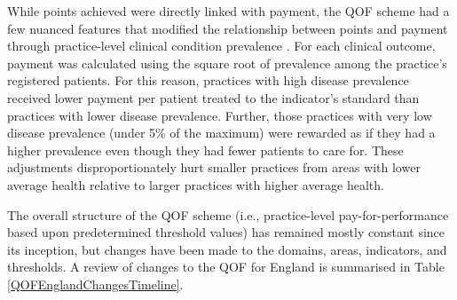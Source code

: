 \documentclass[12pt]{article}
\begin{document}
While points achieved were directly linked with payment, the QOF scheme had a few nuanced features that modified the relationship between points and payment through practice-level clinical condition prevalence \cite{dixonQualityOutcomesFramework2011}. For each clinical outcome, payment was calculated using the square root of prevalence among the practice's registered patients. For this reason, practices with high disease prevalence received lower payment per patient treated to the indicator's standard than practices with lower disease prevalence. Further, those practices with very low disease prevalence (under 5\% of the maximum) were rewarded as if they had a higher prevalence even though they had fewer patients to care for. These adjustments disproportionately hurt smaller practices from areas with lower average health relative to larger practices with higher average health.

The overall structure of the QOF scheme (i.e., practice-level pay-for-performance based upon predetermined threshold values) has remained mostly constant since its inception, but changes have been made to the domains, areas, indicators, and thresholds. A review of changes to the QOF for England is summarised in Table \ref{QOFEnglandChangesTimeline}.
\end{document}

